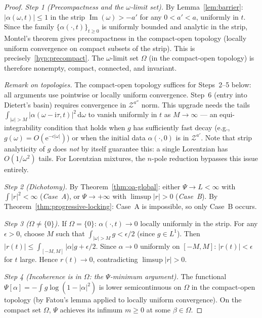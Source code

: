 \documentclass[11pt,a4paper]{article}
\theoremstyle{definition}
\DeclareMathOperator{\im}{Im}
\begin{document}
\begin{proof}
\emph{Step 1 (Precompactness and the $\omega$-limit set).} By Lemma~\ref{lem:barrier}: $|\alpha(\omega,t)| \leq 1$ in the strip $\im(\omega) > -a'$ for any $0 < a' < a$, uniformly in $t$. Since the family $\{\alpha(\cdot,t)\}_{t \geq 0}$ is uniformly bounded and analytic in the strip, Montel's theorem gives precompactness in the compact-open topology (locally uniform convergence on compact subsets of the strip). This is precisely~\ref{hyp:precompact}. The $\omega$-limit set $\Omega$ (in the compact-open topology) is therefore nonempty, compact, connected, and invariant.

\emph{Remark on topologies.} The compact-open topology suffices for Steps~2--5 below: all arguments use pointwise or locally uniform convergence. Step~6 (entry into Dietert's basin) requires convergence in $\mathcal{Z}^{a''}$ norm. This upgrade needs the tails $\int_{|\omega|>M}|\alpha(\omega - \mathrm{i}\tau, t)|^2\,\mathrm{d}\omega$ to vanish uniformly in $t$ as $M \to \infty$ --- an equi-integrability condition that holds when $g$ has sufficiently fast decay (e.g., $g(\omega) = O(\mathrm{e}^{-c|\omega|})$) or when the initial data $\alpha(\cdot, 0)$ is in $\mathcal{Z}^{a'}$. Note that strip analyticity of $g$ does \emph{not} by itself guarantee this: a single Lorentzian has $O(1/\omega^2)$ tails. For Lorentzian mixtures, the $n$-pole reduction bypasses this issue entirely.

\emph{Step 2 (Dichotomy).} By Theorem~\ref{thm:oa-global}: either $\Psi \to L < \infty$ with $\int|r|^2 < \infty$ (\emph{Case~A}), or $\Psi \to +\infty$ with $\limsup|r| > 0$ (\emph{Case~B}). By Theorem~\ref{thm:progressive-locking}: Case~A is impossible, so only Case~B occurs.

\emph{Step 3 ($\Omega \neq \{0\}$).} If $\Omega = \{0\}$: $\alpha(\cdot, t) \to 0$ locally uniformly in the strip. For any $\epsilon > 0$, choose $M$ such that $\int_{|\omega|>M}g < \epsilon/2$ (since $g \in L^1$). Then $|r(t)| \leq \int_{[-M,M]}|\alpha|g + \epsilon/2$. Since $\alpha \to 0$ uniformly on $[-M,M]$: $|r(t)| < \epsilon$ for $t$ large. Hence $r(t) \to 0$, contradicting $\limsup|r| > 0$.

\emph{Step 4 (Incoherence is in $\Omega$: the $\Psi$-minimum argument).} The functional $\Psi[\alpha] = -\int g\log(1-|\alpha|^2)$ is lower semicontinuous on $\Omega$ in the compact-open topology (by Fatou's lemma applied to locally uniform convergence). On the compact set $\Omega$, $\Psi$ achieves its infimum $m \geq 0$ at some $\beta \in \Omega$.


\end{proof}
\end{document}
